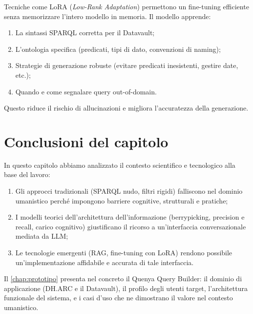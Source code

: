     Tecniche come LoRA (\textit{Low-Rank Adaptation}) permettono un fine-tuning efficiente senza memorizzare l'intero modello in memoria. Il modello apprende:

    \begin{enumerate}
        \item La sintassi SPARQL corretta per il Datavault;
        \item L'ontologia specifica (predicati, tipi di dato, convenzioni di naming);
        \item Strategie di generazione robuste (evitare predicati inesistenti, gestire date, etc.);
        \item Quando e come segnalare query out-of-domain.
    \end{enumerate}

    Questo riduce il rischio di allucinazioni e migliora l'accuratezza della generazione.

\section{Conclusioni del capitolo}\label{sec:conclusioni_cap2}
In questo capitolo abbiamo analizzato il contesto scientifico e tecnologico alla base del lavoro:
    \begin{enumerate}
        \item Gli approcci tradizionali (SPARQL nudo, filtri rigidi) falliscono nel dominio umanistico perché impongono barriere cognitive, strutturali e pratiche;
        \item I modelli teorici dell'architettura dell'informazione (berrypicking, precision e recall, carico cognitivo) giustificano il ricorso a un'interfaccia conversazionale mediata da LLM;\@
        \item Le tecnologie emergenti (RAG, fine-tuning con LoRA) rendono possibile un'implementazione affidabile e accurata di tale interfaccia.
    \end{enumerate}

    Il \cref{chap:prototipo} presenta nel concreto il Quenya Query Builder: il dominio di applicazione (DH.ARC e il Datavault), il profilo degli utenti target, l'architettura funzionale del sistema, e i casi d'uso che ne dimostrano il valore nel contesto umanistico.